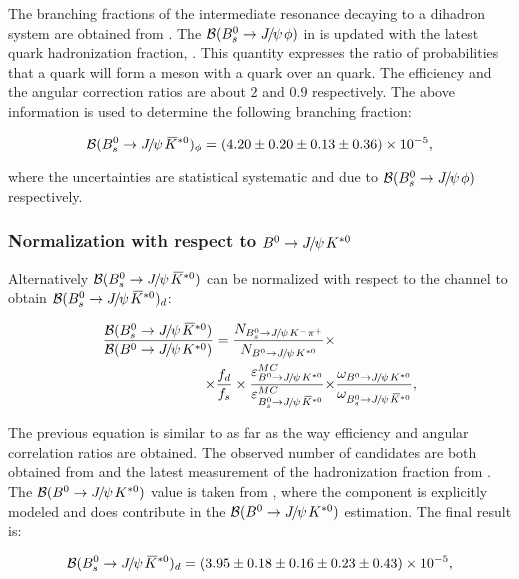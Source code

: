 \noindent The branching fractions of the intermediate resonance decaying to a dihadron system are obtained from \cite{PDG}.
The $\BRof\BsJpsiPhi$ in \cite{SheldonKK} is updated with the latest \bquark quark hadronization
fraction, \fdfs \cite{LHCb-CONF-2013-011}. This quantity expresses the ratio of probabilities that a \bquark quark will form a meson with a
\dquark quark over an \squark quark. The efficiency and the angular correction ratios are about $2$ and $0.9$ respectively.
The above information is used to determine the following branching fraction:

\begin{equation}
  \centering
\BRof\BsJpsiKst_{\Pphi} = (4.20 \pm 0.20 \pm 0.13 \pm 0.36) \times 10^{-5},
\label{Br_JpsiPhi}
\end{equation}

\noindent where the uncertainties are statistical systematic and due to $\BRof\BsJpsiPhi$ respectively.

\subsubsection{Normalization with respect to $\BdJpsiKst$}
Alternatively $\BRof\BsJpsiKst$ can be normalized with respect to the \BdJpsiKst channel to obtain $\BRof{\BsJpsiKst}_\dquark$:

\begin{align}
  \centering
\frac{\BRof\BsJpsiKst}{\BRof\BdJpsiKst} = \frac{N_{\BsJpsiKpi}}{N_{\BdJpsiKst}} \times & \nonumber \\
                                   \times \fdfs
                                   \times \frac{\varepsilon_{\BdJpsiKst}^{MC}}{\varepsilon_{\BsJpsiKst}^{MC}}
                                   \times &\frac{\omega_{\BdJpsiKst}}{\omega_{\BsJpsiKst}},
\label{norm_jpsiKst}
\end{align}

\noindent The previous equation is similar to  as far as the way efficiency and angular correlation ratios are obtained.
The observed number of candidates are both obtained from  and the latest measurement of the hadronization
fraction from \cite{LHCb-CONF-2013-011}. The $\BRof\BdJpsiKst$ value is taken from \cite{Abe:2002haa}, where the \swave component
is explicitly modeled and does contribute in the $\BRof\BdJpsiKst$ estimation. The final result is:

\begin{equation}
  \centering
\BRof\BsJpsiKst_\dquark = (3.95 \pm 0.18 \pm 0.16 \pm 0.23 \pm 0.43 )\times 10^{-5},
\label{Br_JpsiKst}
\end{equation}

